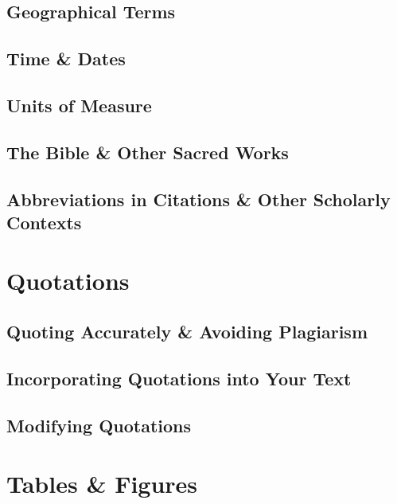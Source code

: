 \documentclass[oneside]{book}
\numberwithin{equation}{section}
\begin{document}
\section{Geographical Terms}

\section{Time \& Dates}

\section{Units of Measure}

\section{The Bible \& Other Sacred Works}

\section{Abbreviations in Citations \& Other Scholarly Contexts}


\chapter{Quotations}

\section{Quoting Accurately \& Avoiding Plagiarism}

\section{Incorporating Quotations into Your Text}

\section{Modifying Quotations}


\chapter{Tables \& Figures}
\end{document}
